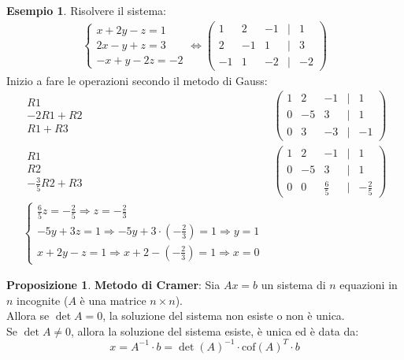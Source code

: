 \documentclass[a4paper]{article}
\theoremstyle{definition}
\newtheorem*{es}{Esempio}
\newtheorem*{prop}{Proposizione}
\begin{document}
	\begin{es}
		Risolvere il sistema:
		\begin{align*}
			\begin{cases}
				x + 2y - z = 1 \\
				2x - y + z = 3 \\
				 - x + y - 2z = - 2
			\end{cases} \Leftrightarrow \begin{pmatrix}
				1 & 2 & -1 & \mid & 1  \\
				2 & -1 & 1 & \mid & 3  \\
				-1 & 1 & -2 & \mid & - 2
			\end{pmatrix}
		\end{align*}
		Inizio a fare le operazioni secondo il metodo di Gauss:
		\begin{align*}
			\begin{matrix}
				R1 \\
				 - 2R1 + R2 \\
				 R1 + R3
			\end{matrix} & \begin{pmatrix}
				1 & 2 & -1 & \mid & 1  \\
				0 & -5 & 3 & \mid & 1  \\
				0 & 3 & -3 & \mid & - 1
			\end{pmatrix} \\
			\begin{matrix}
				R1 \\
				R2 \\
				- \frac{3}{5}R2 + R3
			\end{matrix} & \begin{pmatrix}
				1 & 2 & -1 & \mid & 1  \\
				0 & -5 & 3 & \mid & 1  \\
				0 & 0 & \frac{6}{5} & \mid & - \frac{2}{5}
			\end{pmatrix} \\
			\begin{cases}
				\frac{6}{5}z = - \frac{2}{5} \Rightarrow z = - \frac{2}{3} \\
				-5y + 3z = 1 \Rightarrow -5y + 3 \cdot ( - \frac{2}{3}) = 1 \Rightarrow y = 1 \\
				x + 2y - z = 1 \Rightarrow x + 2 - ( - \frac{2}{3}) = 1 \Rightarrow x = 0
			\end{cases}
		\end{align*}
	\end{es}
	\begin{prop}
		\textbf{Metodo di Cramer}: Sia $Ax = b$ un sistema di $n$ equazioni in $n$ incognite ($A$ è una matrice $n \times n$). \\
		Allora se $\det A = 0$, la soluzione del sistema non esiste o non è unica. \\
		Se $\det A \ne 0$, allora la soluzione del sistema esiste, è unica ed è data da:
		\begin{equation*}
			x = A^{-1} \cdot b = \det(A)^{-1} \cdot \text{cof}(A)^T \cdot b
		\end{equation*}
	\end{prop}
\end{document}

